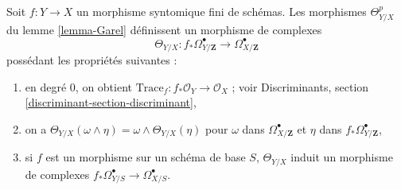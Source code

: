 \begin{proposition}
\label{proposition-Garel}
\begin{reference}
\cite{Garel}
\end{reference}
Soit $f : Y \to X$ un morphisme syntomique fini de schémas.
Les morphismes $\Theta^p_{Y/X}$ du lemme \ref{lemma-Garel} définissent un morphisme de complexes
$$
\Theta_{Y/X} :
f_*\Omega^\bullet_{Y/\mathbf{Z}}
\longrightarrow
\Omega^\bullet_{X/\mathbf{Z}}
$$
possédant les propriétés suivantes :
\begin{enumerate}
\item en degré $0$, on obtient
$\text{Trace}_f : f_*\mathcal{O}_Y \to \mathcal{O}_X$ ; voir
Discriminants, section \ref{discriminant-section-discriminant},
\item on a
$\Theta_{Y/X}(\omega \wedge \eta) = \omega \wedge \Theta_{Y/X}(\eta)$
pour $\omega$ dans $\Omega^\bullet_{X/\mathbf{Z}}$ et $\eta$
dans $f_*\Omega^\bullet_{Y/\mathbf{Z}}$,
\item si $f$ est un morphisme sur un schéma de base $S$,
$\Theta_{Y/X}$ induit un morphisme de complexes
$f_*\Omega^\bullet_{Y/S} \to \Omega^\bullet_{X/S}$.
\end{enumerate}
\end{proposition}

